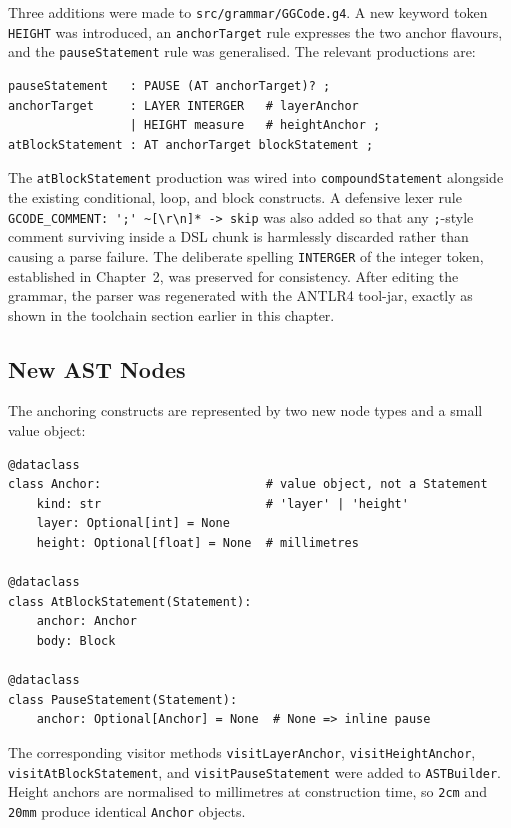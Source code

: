Three additions were made to \texttt{src/grammar/GGCode.g4}. A new keyword token \texttt{HEIGHT} was introduced, an \texttt{anchorTarget} rule expresses the two anchor flavours, and the \texttt{pauseStatement} rule was generalised. The relevant productions are:

\begin{verbatim}
pauseStatement   : PAUSE (AT anchorTarget)? ;
anchorTarget     : LAYER INTERGER   # layerAnchor
                 | HEIGHT measure   # heightAnchor ;
atBlockStatement : AT anchorTarget blockStatement ;
\end{verbatim}

The \texttt{atBlockStatement} production was wired into \texttt{compoundStatement} alongside the existing conditional, loop, and block constructs. A defensive lexer rule \verb|GCODE_COMMENT: ';' ~[\r\n]* -> skip| was also added so that any \texttt{;}-style comment surviving inside a DSL chunk is harmlessly discarded rather than causing a parse failure. The deliberate spelling \texttt{INTERGER} of the integer token, established in Chapter~2, was preserved for consistency. After editing the grammar, the parser was regenerated with the ANTLR4 tool-jar, exactly as shown in the toolchain section earlier in this chapter.

\subsection*{New AST Nodes}

The anchoring constructs are represented by two new node types and a small value object:

\begin{verbatim}
@dataclass
class Anchor:                       # value object, not a Statement
    kind: str                       # 'layer' | 'height'
    layer: Optional[int] = None
    height: Optional[float] = None  # millimetres

@dataclass
class AtBlockStatement(Statement):
    anchor: Anchor
    body: Block

@dataclass
class PauseStatement(Statement):
    anchor: Optional[Anchor] = None  # None => inline pause
\end{verbatim}

The corresponding visitor methods \texttt{visitLayerAnchor}, \texttt{visitHeightAnchor}, \texttt{visitAtBlockStatement}, and \texttt{visitPauseStatement} were added to \texttt{ASTBuilder}. Height anchors are normalised to millimetres at construction time, so \texttt{2cm} and \texttt{20mm} produce identical \texttt{Anchor} objects.

